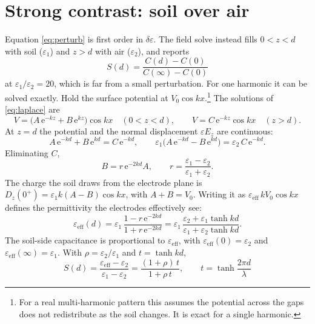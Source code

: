 \documentclass[11pt,letterpaper]{article}
\newcommand{\e}{\mathrm{e}}
\newcommand{\eff}{\mathrm{eff}}
\begin{document}
\section{Strong contrast: soil over air}

Equation \eqref{eq:perturb} is first order in $\delta\varepsilon$. The field solve instead fills
$0 < z < d$ with soil ($\varepsilon_1$) and $z > d$ with air ($\varepsilon_2$), and reports
\[
  S(d) = \frac{C(d) - C(0)}{C(\infty) - C(0)}
\]
at $\varepsilon_1/\varepsilon_2 = 20$, which is far from a small perturbation. For one harmonic it can be
solved exactly. Hold the surface potential at $V_0\cos kx$.\footnote{For a real multi-harmonic pattern
this assumes the potential across the gaps does not redistribute as the soil changes. It is exact for a
single harmonic.} The solutions of \eqref{eq:laplace} are
\begin{equation}
  V = \bigl( A\,\e^{-kz} + B\,\e^{kz} \bigr)\cos kx \quad (0 < z < d), \qquad
  V = C\,\e^{-kz}\cos kx \quad (z > d).
  \label{eq:layer}
\end{equation}
At $z = d$ the potential and the normal displacement $\varepsilon E_z$ are continuous:
\begin{equation}
  A\,\e^{-kd} + B\,\e^{kd} = C\,\e^{-kd}, \qquad
  \varepsilon_1 \bigl( A\,\e^{-kd} - B\,\e^{kd} \bigr) = \varepsilon_2\, C\,\e^{-kd}.
  \label{eq:bc}
\end{equation}
Eliminating $C$,
\begin{equation}
  B = r\,\e^{-2kd} A, \qquad r = \frac{\varepsilon_1 - \varepsilon_2}{\varepsilon_1 + \varepsilon_2}.
  \label{eq:reflect}
\end{equation}
The charge the soil draws from the electrode plane is $D_z(0^+) = \varepsilon_1 k (A - B)\cos kx$, with
$A + B = V_0$. Writing it as $\varepsilon_\eff\, k V_0 \cos kx$ defines the permittivity the electrodes
effectively see:
\begin{equation}
  \varepsilon_\eff(d)
  = \varepsilon_1\, \frac{1 - r\,\e^{-2kd}}{1 + r\,\e^{-2kd}}
  = \varepsilon_1\, \frac{\varepsilon_2 + \varepsilon_1 \tanh kd}{\varepsilon_1 + \varepsilon_2 \tanh kd}.
  \label{eq:eeff}
\end{equation}
The soil-side capacitance is proportional to $\varepsilon_\eff$, with $\varepsilon_\eff(0) =
\varepsilon_2$ and $\varepsilon_\eff(\infty) = \varepsilon_1$. With $\rho = \varepsilon_2/\varepsilon_1$
and $t = \tanh kd$,
\begin{equation}
  \boxed{\;S(d) = \frac{\varepsilon_\eff - \varepsilon_2}{\varepsilon_1 - \varepsilon_2}
  = \frac{(1+\rho)\,t}{1 + \rho\, t}, \qquad t = \tanh\frac{2\pi d}{\lambda}\;}
  \label{eq:sfinite}
\end{equation}
\end{document}
